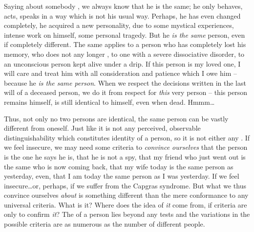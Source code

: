 Saying about somebody , we always know that he is the
same; he only behaves, acts, speaks in a way which is not his usual way.
Perhaps, he has even changed completely, he acquired a new personality, due to
some mystical experiences, intense work on himself, some personal tragedy.  But
he {\em is the same} person, even if completely different.  The same applies to
a person who has completely lost his memory, who does not any longer , to one with a severe dissociative disorder, to an
unconscious person kept alive under a drip.  If this person is my loved one, I
will care and treat him with all consideration and patience which I owe him --
because he {\em is the same person}.  When we respect the decisions written in
the last will of a deceased person, we do it from respect for {\em this} very
person -- this person remains himself, is still identical to himself, even when
dead.  Hmmm\ldots

Thus, not only no two persons are identical, the same person can be vastly
different from oneself.  Just like it is not any  perceived,
observable distinguishability which constitutes identity of a person, so it is
not either any .  If we feel insecure, we may need some
criteria to {\em convince ourselves} that the person is the one he says he is,
that he is not a spy, that my friend who just went out is the same who is now
coming back, that my wife today is the same person as yesterday, even, that I am
today the same person as I was yesterday.  If we feel
insecure\ldots or, perhaps, if we suffer from the Capgras syndrome. But what we
thus convince ourselves {\em about} is something different than the mere
conformance to any universal criteria.  What is it?  Where does the idea of {\em
  it} come from, if criteria are only to confirm {\em it}?  The  of a
person lies beyond any tests and the variations in the possible criteria are as
numerous as the number of different people.

